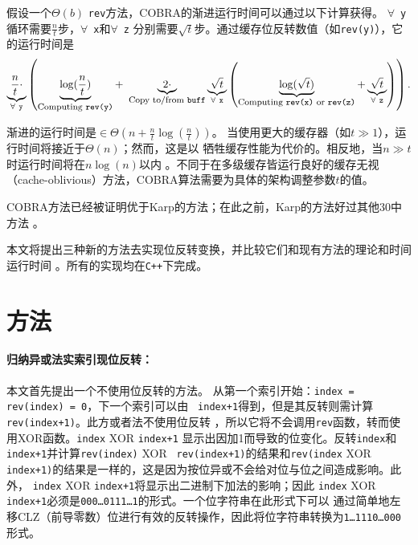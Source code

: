 \documentclass[10pt]{article}
\begin{document}
\begin{CJK*}{UTF8}{gbsn}
假设一个$\Theta(b)$ {\tt rev}方法，COBRA的渐进运行时间可以通过以下计算获得。
$\forall$~{\tt y}循环需要$\frac{n}{t}$步，$\forall$~{\tt x}和$\forall$~{\tt z}
分别需要$\sqrt{t}$步。通过缓存位反转数值（如{\tt rev(y)}），它的运行时间是
\[
\underbrace{\frac{n}{t} \cdot }_{\forall~{\tt y}} \left( \underbrace{ \log(\frac{n}{t}) }_{\mbox{\footnotesize Computing {\tt rev(y)}}} +~ \underbrace{2 \cdot}_{\mbox{\footnotesize Copy to/from {\tt buff}}} \underbrace{\sqrt{t}}_{\forall~{\tt x}} \left(
\underbrace{\log(\sqrt{t})}_{\mbox{\footnotesize Computing {\tt rev(x)} or {\tt rev(z)}}} + \underbrace{\sqrt{t}}_{\forall~{\tt z}} \right) \right).
\]

渐进的运行时间是$\in \Theta\left( n + \frac{n}{t} \log(\frac{n}{t}) \right)$。
当使用更大的缓存器（如$t \gg 1$），运行时间将接近于$\Theta\left( n\right)$；然而，这是以
牺牲缓存性能为代价的。相反地，当$n \gg t$时运行时间将在$n \log(n)$以内
。不同于在多级缓存皆运行良好的缓存无视（cache-oblivious）方法，COBRA算法需要为具体的架构调整参数$t$的值。

COBRA方法已经被证明优于Karp的方法\cite{carter:towards}；在此之前，Karp的方法好过其他30中方法
\cite{karp:bit}。\newline

本文将提出三种新的方法去实现位反转变换，并比较它们和现有方法的理论和时间运行时间
。所有的实现均在{\tt C++}下完成。

\section*{方法}

\paragraph{归纳异或法实索引现位反转：}
本文首先提出一个不使用位反转的方法。
从第一个索引开始：{\tt index = rev(index) = 0}，下一个索引可以由 {\tt
  index+1}得到，但是其反转则需计算{\tt rev(index+1)}。此方或者法不使用位反转
，所以它将不会调用{\tt rev}函数，转而使用XOR函数。{\tt index} XOR {\tt index+1}
显示出因加1而导致的位变化。反转{\tt index}和{\tt index+1}并计算{\tt rev(index)} XOR {\tt
  rev(index+1)}的结果和{\tt rev(}{\tt index}
XOR {\tt index+1)}的结果是一样的，这是因为按位异或不会给对位与位之间造成影响。此外，
{\tt index} XOR {\tt index+1}将显示出二进制下加法的影响；因此 {\tt index} XOR {\tt
index+1}必须是{\tt 000\ldots 0111\ldots 1}的形式。一个位字符串在此形式下可以
通过简单地左移CLZ（前导零数）位进行有效的反转操作，因此将位字符串转换为{\tt 1\ldots 1110\ldots 000}形式。


\end{CJK*}
\end{document}
